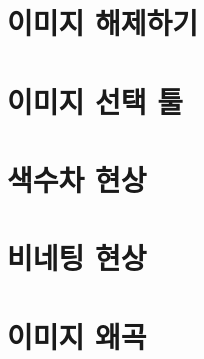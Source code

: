 \documentclass[12pt, a4paper, oneside]{book}
\let\stdsection\section
\renewcommand\section{\newpage\stdsection}
\begin{document}
\section{	이미지 해제하기				}							
\section{	이미지 선택 툴				}							




	\section{	색수차 현상				}							
	\section{	비네팅 현상				}							
	\section{	이미지 왜곡				}							




\end{document}
